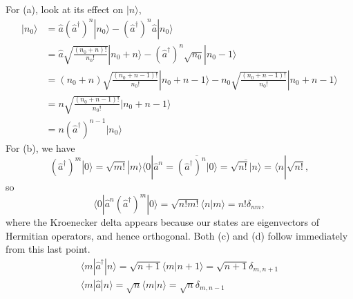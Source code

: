 \documentclass[../qft-for-the-gifted-amateur.tex]{subfiles}
\begin{document}
\begin{questions}
	\begin{solution}
	For (a), look at its effect on $|n\rangle$,
	\begin{align*}
		[\hat{a},({\hat{a}}^{\dagger})^{n}]|n_{0}\rangle &= \hat{a}({\hat{a}}^{\dagger})^{n}|n_{0}\rangle - ({\hat{a}}^{\dagger})^{n}\hat{a}|n_{0}\rangle \\
		 &= \hat{a}\sqrt{\frac{(n_{0} + n)!}{n_{0}!}}|n_{0} + n\rangle - ({\hat{a}}^{\dagger})^{n}\sqrt{n_{0}}|n_{0} - 1\rangle \\
		 &= (n_{0} + n)\sqrt{\frac{(n_{0} + n - 1)!}{n_{0}!}}|n_{0} + n - 1\rangle - n_{0}\sqrt{\frac{(n_{0} + n - 1)!}{n_{0}!}}|n_{0} + n - 1\rangle \\
		 &= n\sqrt{\frac{(n_{0} + n - 1)!}{n_{0}!}}|n_{0} + n - 1\rangle \\
		 &= n({\hat{a}}^{\dagger})^{n - 1}|n_{0}\rangle
	\end{align*}
	For (b), we have
	\[
	({\hat{a}}^{\dagger})^{m}|0\rangle = \sqrt{m!}|m\rangle\langle 0|{\hat{a}}^{n} = \overline{({\hat{a}}^{\dagger})^{n}|0\rangle} = \overline{\sqrt{n!}|n\rangle} = \langle n|\sqrt{n!},
	\]
	so
	\[
	\langle 0|{\hat{a}}^{n}({\hat{a}}^{\dagger})^{m}|0\rangle = \sqrt{n!m!}\langle n|m\rangle = n!\delta_{nm},
	\]
	where the Kroenecker delta appears because our states are eigenvectors
	of Hermitian operators, and hence orthogonal. Both (c) and (d) follow
	immediately from this last point.
	\begin{gather*}
	\langle m|{\hat{a}}^{\dagger}|n\rangle = \sqrt{n + 1}\langle m|n + 1\rangle = \sqrt{n + 1}\delta_{m,n + 1} \\
	\langle m|\hat{a}|n\rangle = \sqrt{n}\langle m|n\rangle = \sqrt{n}\delta_{m,n - 1}
	\end{gather*}
\end{solution}


\end{questions}
\end{document}

